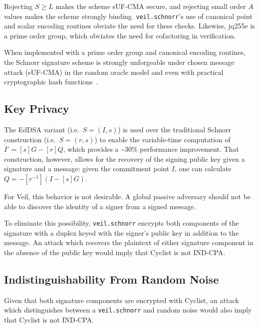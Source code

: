 Rejecting $S \geq L$ makes the scheme sUF-CMA secure, and rejecting small order $A$ values makes the
scheme strongly binding. \texttt{veil.schnorr}'s use of canonical point and scalar encoding routines
obviate the need for these checks. Likewise, jq255e is a prime order group, which obviates the need
for cofactoring in verification.

When implemented with a prime order group and canonical encoding routines, the Schnorr signature
scheme is strongly unforgeable under chosen message attack (sUF-CMA) in the random oracle model and
even with practical cryptographic hash functions~\cite{pointcheval2000,neven2009}.

\subsection{Key Privacy}\label{subsec:veil.schnorr-key-privacy}

The EdDSA variant (i.e.\ $S=(I,s)$) is used over the traditional Schnorr construction (i.e.\
$S=(r,s)$) to enable the variable-time computation of $I'=[s]G - [r]Q$, which provides a
\textasciitilde30\% performance improvement. That construction, however, allows for the recovery of
the signing public key given a signature and a message: given the commitment point $I$, one can
calculate $Q=-[r^{-1}](I - [s]G)$.

For Veil, this behavior is not desirable. A global passive adversary should not be able to discover
the identity of a signer from a signed message.

To eliminate this possibility, \texttt{veil.schnorr} encrypts both components of the signature with
a duplex keyed with the signer's public key in addition to the message. An attack which recovers the
plaintext of either signature component in the absence of the public key would imply that Cyclist is
not IND-CPA\@.

\subsection{Indistinguishability From Random Noise}\label{subsec:veil.schnorr-indistinguishability}

Given that both signature components are encrypted with Cyclist, an attack which distinguishes
between a \texttt{veil.schnorr} and random noise would also imply that Cyclist is not IND-CPA\@.
